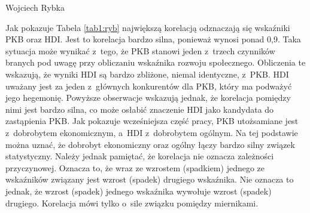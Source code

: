 \begin{artplenv}{Wojciech Rybka}
\begin{table}[H]
	\caption{Zależność pomiędzy danymi otrzymanymi ze wskaźników.
	Źródło: obliczenia własne na podstawie
	\parencite{international_monetary_fund_world_2019a,united_nations_development_programme_human_2019,noauthor_world_2018}.
	}
	\label{tab1:ryb}
\end{table}


%

Jak pokazuje Tabela \ref{tab1:ryb} największą korelacją odznaczają się wskaźniki PKB oraz HDI. Jest to korelacja bardzo silna,
ponieważ wynosi ponad 0,9. Taka sytuacja może wynikać z~tego, że PKB stanowi jeden z~trzech czynników branych pod uwagę
przy obliczaniu wskaźnika rozwoju społecznego. Obliczenia te wskazują, że wyniki HDI są bardzo zbliżone, niemal
identyczne, z~PKB. HDI uważany jest za jeden z~głównych konkurentów dla PKB, który ma podważyć jego hegemonię. Powyższe
obserwacje wskazują jednak, że korelacja pomiędzy nimi jest bardzo silna, co może osłabić znaczenie HDI jako
kandydata do zastąpienia PKB. Jak pokazuje wcześniejsza część pracy, PKB utożsamiane jest z~dobrobytem ekonomicznym,
a~HDI z~dobrobytem ogólnym. Na tej podstawie można uznać, że dobrobyt ekonomiczny oraz ogólny łączy bardzo silny związek
statystyczny. Należy jednak pamiętać, że korelacja nie oznacza zależności przyczynowej. Oznacza to, że wraz ze wzrostem (spadkiem)
jednego ze wskaźników związany jest wzrost (spadek) drugiego wskaźnika. Nie oznacza to jednak, że wzrost (spadek)
jednego wskaźnika wywołuje wzrost (spadek) drugiego. Korelacja mówi tylko o~sile związku pomiędzy miernikami. 


\end{artplenv}
